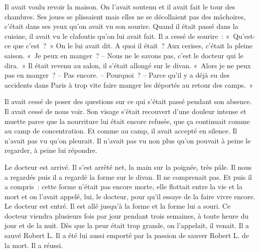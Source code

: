 {\bigskip

Il avait voulu revoir la maison. On l'avait soutenu et il avait fait
le tour des chambres. Ses joues se plissaient mais elles ne se
décollaient pas des mâchoires, c'était dans ses yeux qu'on avait vu
son sourire. Quand il était passé dans la cuisine, il avait vu le
clafoutis qu'on lui avait fait. Il a cessé de sourire~: «~Qu'est-ce
que c'est~?~» On le lui avait dit. A quoi il était~? Aux cerises,
c'était la pleine saison. «~Je peux en manger~? – Nous ne le savons
pas, c'est le docteur qui le dira.~» Il était revenu au salon, il
s'était allongé sur le divan. «~Alors je ne peux pas en manger~? –
Pas encore. – Pourquoi~? – Parce qu'il y a déjà eu des accidents dans
Paris à trop vite faire manger les déportés au retour des camps.~»

Il avait cessé de poser des questions sur ce qui s'était passé pendant
son absence. Il avait cessé de nous voir. Son visage s'était
recouvert d'une douleur intense et muette parce que la nourriture lui
était encore refusée, que ça continuait comme au camp de
concentration. Et comme au camp, il avait accepté en silence. Il
n'avait pas vu qu'on pleurait. Il n'avait pas vu non plus qu'on
pouvait à peine le regarder, à peine lui répondre.

\bigskip

Le docteur est arrivé. Il s'est arrêté net, la main sur la poignée,
très pâle. Il nous a regardés puis il a regardé la forme sur le
divan. Il ne comprenait pas. Et puis il a compris~: cette forme
n'était pas encore morte, elle flottait entre la vie et la mort et on
l'avait appelé, lui, le docteur, pour qu'il essaye de la faire vivre
encore. Le docteur est entré. Il est allé jusqu'à la forme et la
forme lui a souri. Ce docteur viendra plusieurs fois par jour pendant
trois semaines, à toute heure du jour et de la nuit. Dès que la peur
était trop grande, on l'appelait, il venait. Il a sauvé Robert L. Il
a été lui aussi emporté par la passion de sauver Robert L. de la
mort. Il a réussi.
 }


